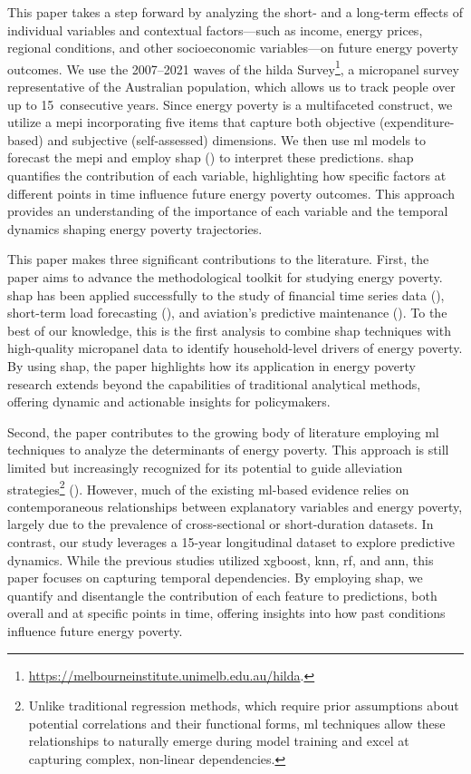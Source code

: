 \documentclass[preprint,authoryear,12pt]{elsarticle}
\newcommand{\citeTwo}[1]{(\cite{#1})}
\begin{document}
This paper takes a step forward by analyzing the short- and a long-term effects of individual variables and contextual factors---such as income, energy prices, regional conditions, and other socioeconomic variables---on future energy poverty outcomes. We use the 2007--2021 waves of the \Gls{hilda} Survey\footnote{\href{https://melbourneinstitute.unimelb.edu.au/hilda}{https://melbourneinstitute.unimelb.edu.au/hilda}.}, a micropanel survey representative of the Australian population, which allows us to track people over up to 15~consecutive years. Since energy poverty is a multifaceted construct, we utilize a \Gls{mepi} incorporating five items that capture both objective (expenditure-based) and subjective (self-assessed) dimensions. We then use \Gls{ml} models to forecast the \Gls{mepi} and employ \Gls{shap} \citeTwo{LL17} to interpret these predictions. \Gls{shap} quantifies the contribution of each variable, highlighting how specific factors at different points in time influence future energy poverty outcomes. This approach provides an understanding of the importance of each variable and the temporal dynamics shaping energy poverty trajectories.

This paper makes three significant contributions to the literature. First, the paper aims to advance the methodological toolkit for studying energy poverty. \Gls{shap} has been applied successfully to the study of financial time series data \citeTwo{MHB19}, short-term load forecasting \citeTwo{LOKK23}, and aviation’s predictive maintenance \citeTwo{AA24}. To the best of our knowledge, this is the first analysis to combine \Gls{shap} techniques with high-quality micropanel data to identify household-level drivers of energy poverty. By using \Gls{shap}, the paper highlights how its application in energy poverty research extends beyond the capabilities of traditional analytical methods, offering dynamic and actionable insights for policymakers.

Second, the paper contributes to the growing body of literature employing \Gls{ml} techniques to analyze the determinants of energy poverty. This approach is still limited but increasingly recognized for its potential to guide alleviation strategies\footnote{Unlike traditional regression methods, which require prior assumptions about potential correlations and their functional forms, \Gls{ml} techniques allow these relationships to naturally emerge during model training and excel at capturing complex, non-linear dependencies.} \citeTwo{DSv21,vDv22,SRL23,GJA24}. However, much of the existing \Gls{ml}-based evidence relies on contemporaneous relationships between explanatory variables and energy poverty, largely due to the prevalence of cross-sectional or short-duration datasets. In contrast, our study leverages a 15-year longitudinal dataset to explore predictive dynamics. While the previous studies utilized \Gls{xgboost}, \Gls{knn}, \Gls{rf}, and \Gls{ann}, this paper focuses on capturing temporal dependencies. By employing \Gls{shap}, we quantify and disentangle the contribution of each feature to predictions, both overall and at specific points in time, offering insights into how past conditions influence future energy poverty. 
\end{document}
